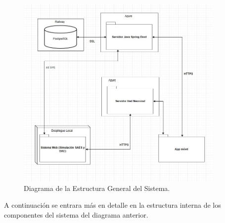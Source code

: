 \begin{figure}[htbp!]
	\begin{center}
		\includegraphics[width=0.9\textwidth]{images/DiagramaGeneralClases}
		\caption{Diagrama de la Estructura General del Sistema.}
		\label{fig:Diagrama de sistemas}
	\end{center}
\end{figure}

A continuación se entrara más en detalle en la estructura interna de los componentes del sistema del diagrama anterior.
